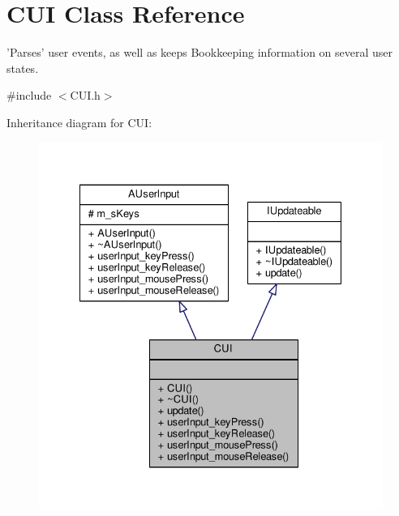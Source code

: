 \hypertarget{classCUI}{\section{C\-U\-I Class Reference}
\label{classCUI}
}


'Parses' user events, as well as keeps Bookkeeping information on several user states.  




{\ttfamily \#include $<$C\-U\-I.\-h$>$}



Inheritance diagram for C\-U\-I\-:
\nopagebreak
\begin{figure}[H]
\begin{center}
\leavevmode
\includegraphics[width=331pt]{classCUI__inherit__graph}
\end{center}
\end{figure}


